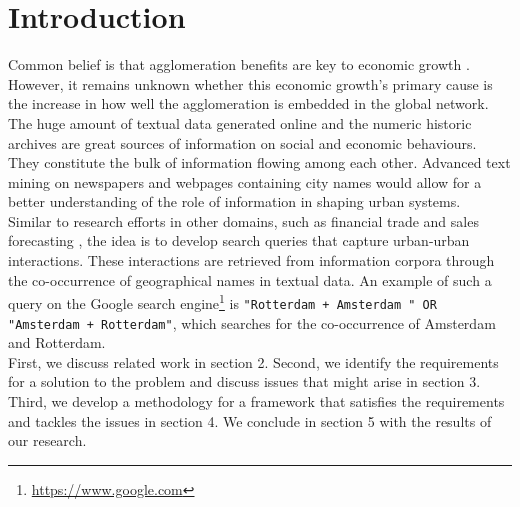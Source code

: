 \section{Introduction}


Common belief is that agglomeration benefits are key to economic growth \cite{porter2000location}. However, it remains unknown whether this economic growth's primary cause is the increase in how well the agglomeration is embedded in the global network. \\

The huge amount of textual data generated online and the numeric historic archives are great sources of information on social and economic behaviours. They constitute the bulk of information flowing among each other. Advanced text mining on newspapers and webpages containing city names would allow for a better understanding of the role of information in shaping urban systems. \\
Similar to research efforts in other domains, such as financial trade \cite{preis2013quantifying} and sales forecasting \cite{wu2014future}, the idea is to develop search queries that capture urban-urban interactions. These interactions are retrieved from information corpora through the co-occurrence of geographical names in textual data. An example of such a query on the Google search engine\footnote{\url{https://www.google.com}} is \texttt{"Rotterdam + Amsterdam " OR "Amsterdam + Rotterdam"}, which searches for the co-occurrence of Amsterdam and Rotterdam. \\

First, we discuss related work in section 2. Second, we identify the requirements for a solution to the problem and discuss issues that might arise in section 3. Third, we develop a methodology for a framework that satisfies the requirements and tackles the issues in section 4. We conclude in section 5 with the results of our research.

